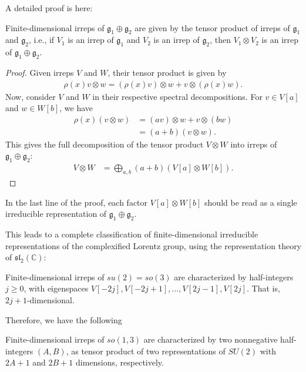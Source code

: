 A detailed proof is here:
\begin{theorem}
    Finite-dimensional irreps of $\mathfrak{g_1} \oplus \mathfrak{g_2}$ are given by the tensor product of irreps of $\mathfrak{g_1}$ and $\mathfrak{g_2}$, i.e., if $V_1$ is an irrep of $\mathfrak{g_1}$ and $V_2$ is an irrep of $\mathfrak{g_2}$, then $V_1 \otimes V_2$ is an irrep of $\mathfrak{g_1} \oplus \mathfrak{g_2}$.
\end{theorem}
\begin{proof}
    Given irreps $V$ and $W$, their tensor product is given by
    \begin{align*}
        \rho(x) v \otimes w = (\rho(x) v) \otimes w + v \otimes (\rho(x) w).
    \end{align*}
    Now, consider $V$ and $W$ in their respective spectral decompositions. For $v \in V[a]$ and $w \in W[b]$, we have
    \begin{align*}
        \rho(x) (v \otimes w) &= (a v) \otimes w + v \otimes (b w) \\
        &= (a + b) (v \otimes w).
    \end{align*}
    This gives the full decomposition of the tensor product $V \otimes W$ into irreps of $\mathfrak{g_1} \oplus \mathfrak{g_2}$:
    \begin{align}
    \label{eqn:clebsch-gordan}
        V \otimes W &= \bigoplus_{a, b} (a + b) (V[a] \otimes W[b]).
    \end{align}
\end{proof}

In the last line of the proof, each factor $V[a] \otimes W[b]$ should be read as a single irreducible representation of $\mathfrak{g}_1 \oplus \mathfrak{g}_2$.

This leads to a complete classification of finite-dimensional irreducible representations of the complexified Lorentz group, using the representation theory of $\mathfrak{sl}_2(\mathbb{C})$:

\begin{fact}
    Finite-dimensional irreps of $su(2) = so(3)$ are characterized by half-integers $j \geq 0$, with eigenspaces $V[-2j], V[-2j+1], \ldots, V[2j-1], V[2j]$. That is, $2j+1$-dimensional.
\end{fact}

Therefore, we have the following

\begin{fact}
    Finite-dimensional irreps of $so(1,3)$ are characterized by two nonnegative half-integers $(A,B)$, as tensor product of two representations of $SU(2)$ with $2A+1$ and $2B+1$ dimensions, respectively.
\end{fact}

